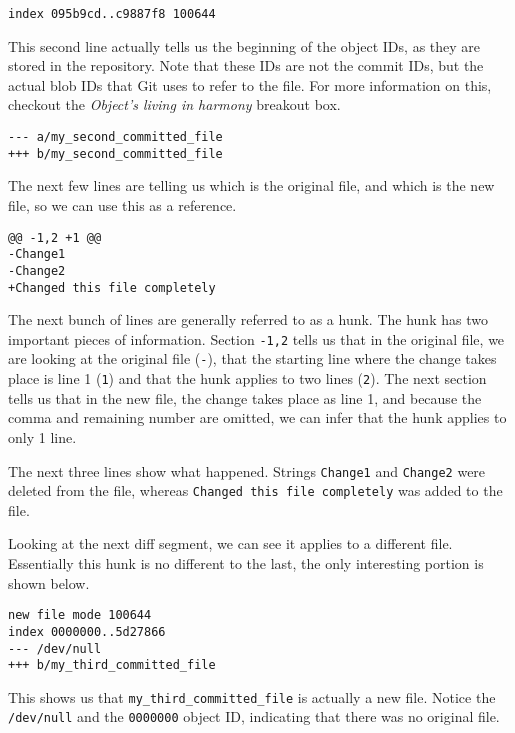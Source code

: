 \begin{Verbatim}[frame=leftline,framerule=1mm,fontsize=\relsize{-3}] 
index 095b9cd..c9887f8 100644
\end{Verbatim}

This second line actually tells us the beginning of the object IDs, as they are stored in the repository.  Note that these IDs are not the commit IDs, but the actual blob IDs that Git uses to refer to the file.  For more information on this, checkout the \emph{Object's living in harmony} breakout box.

\begin{Verbatim}[frame=leftline,framerule=1mm,fontsize=\relsize{-3}] 
--- a/my_second_committed_file
+++ b/my_second_committed_file
\end{Verbatim}

The next few lines are telling us which is the original file, and which is the new file, so we can use this as a reference.

\begin{Verbatim}[frame=leftline,framerule=1mm,fontsize=\relsize{-3}] 
@@ -1,2 +1 @@
-Change1
-Change2
+Changed this file completely
\end{Verbatim}

The next bunch of lines are generally referred to as a hunk.  The hunk has two important pieces of information.  Section \texttt{-1,2} tells us that in the original file, we are looking at the original file (\texttt{-}), that the starting line where the change takes place is line 1 (\texttt{1}) and that the hunk applies to two lines (\texttt{2}).  The next section tells us that in the new file, the change takes place as line 1, and because the comma and remaining number are omitted, we can infer that the hunk applies to only 1 line.

The next three lines show what happened.  Strings \texttt{Change1} and \texttt{Change2} were deleted from the file, whereas \texttt{Changed this file completely} was added to the file.

Looking at the next diff segment, we can see it applies to a different file.  Essentially this hunk is no different to the last, the only interesting portion is shown below.

\begin{Verbatim}[frame=leftline,framerule=1mm,fontsize=\relsize{-3}] 
new file mode 100644
index 0000000..5d27866
--- /dev/null
+++ b/my_third_committed_file
\end{Verbatim}

This shows us that \texttt{my\_third\_committed\_file} is actually a new file.  Notice the \texttt{/dev/null} and the \texttt{0000000} object ID, indicating that there was no original file.


